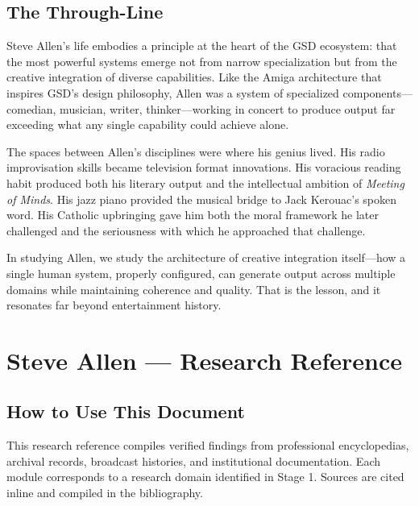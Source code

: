 \documentclass[11pt,letterpaper]{article}
\newcommand{\stageheader}[2]{%
  \noindent\colorbox{#2}{\makebox[\textwidth][l]{%
    \textcolor{white}{\bfseries\sffamily\hspace{6pt}#1\hspace{6pt}}}}%
  \vspace{0.5em}\par%
}
\begin{document}
\subsection{The Through-Line}

Steve Allen's life embodies a principle at the heart of the GSD ecosystem: that the most powerful systems emerge not from narrow specialization but from the creative integration of diverse capabilities. Like the Amiga architecture that inspires GSD's design philosophy, Allen was a system of specialized components---comedian, musician, writer, thinker---working in concert to produce output far exceeding what any single capability could achieve alone.

The spaces between Allen's disciplines were where his genius lived. His radio improvisation skills became television format innovations. His voracious reading habit produced both his literary output and the intellectual ambition of \textit{Meeting of Minds}. His jazz piano provided the musical bridge to Jack Kerouac's spoken word. His Catholic upbringing gave him both the moral framework he later challenged and the seriousness with which he approached that challenge.

In studying Allen, we study the architecture of creative integration itself---how a single human system, properly configured, can generate output across multiple domains while maintaining coherence and quality. That is the lesson, and it resonates far beyond entertainment history.

\newpage

\stageheader{STAGE 2 --- RESEARCH REFERENCE}{secondary}

\section{Steve Allen --- Research Reference}

\subsection{How to Use This Document}

This research reference compiles verified findings from professional encyclopedias, archival records, broadcast histories, and institutional documentation. Each module corresponds to a research domain identified in Stage 1. Sources are cited inline and compiled in the bibliography.
\end{document}

